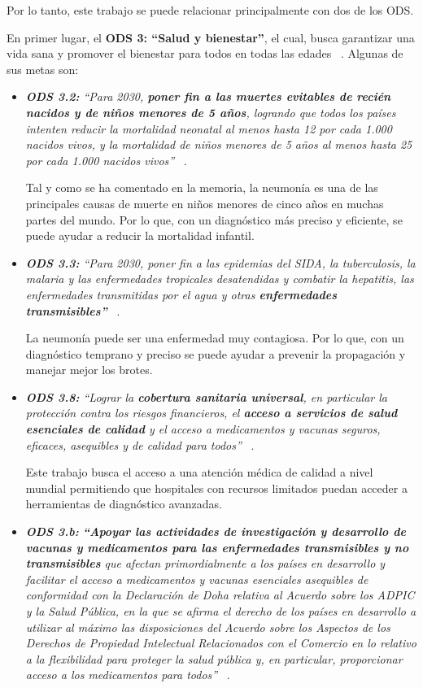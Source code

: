 Por lo tanto, este trabajo se puede relacionar principalmente con dos de los ODS.

En primer lugar, el\textbf{ ODS 3: ``Salud y bienestar''}, el cual, busca garantizar una vida sana y promover el bienestar para todos en todas las edades ~\cite{ObDeSoSalud24}. Algunas de sus metas son:
\begin{itemize}
    \item \textit{\textbf{ODS 3.2:}  ``Para 2030, \textbf{poner fin a las muertes evitables de recién nacidos y de niños menores de 5 años}, logrando que todos los países intenten reducir la mortalidad neonatal al menos hasta 12 por cada 1.000 nacidos vivos, y la mortalidad de niños menores de 5 años al menos hasta 25 por cada 1.000 nacidos vivos''} ~\cite{ObDeSoSalud24}.

    Tal y como se ha comentado en la memoria, la neumonía es una de las principales causas de muerte en niños menores de cinco años en muchas partes del mundo. Por lo que, con un diagnóstico más preciso y eficiente, se puede ayudar a reducir la mortalidad infantil.
    
    \item \textit{\textbf{ODS 3.3:}  ``Para 2030, poner fin a las epidemias del SIDA, la tuberculosis, la malaria y las enfermedades tropicales desatendidas y combatir la hepatitis, las enfermedades transmitidas por el agua y otras \textbf{enfermedades transmisibles''}} ~\cite{ObDeSoSalud24}. 
    
    La neumonía puede ser una enfermedad muy contagiosa. Por lo que, con un diagnóstico temprano y preciso se puede ayudar a prevenir la propagación y manejar mejor los brotes.

    \item \textit{\textbf{ODS 3.8:}  ``Lograr la \textbf{cobertura sanitaria universal}, en particular la protección contra los riesgos financieros, el \textbf{acceso a servicios de salud esenciales de calidad} y el acceso a medicamentos y vacunas seguros, eficaces, asequibles y de calidad para todos''} ~\cite{ObDeSoSalud24}.

    Este trabajo busca el acceso a una atención médica de calidad a nivel mundial permitiendo que hospitales con recursos limitados puedan acceder a herramientas de diagnóstico avanzadas.

    \item \textit{\textbf{ODS 3.b:}  \textbf{``Apoyar las actividades de investigación y desarrollo de vacunas y medicamentos para las enfermedades transmisibles y no transmisibles} que afectan primordialmente a los países en desarrollo y facilitar el acceso a medicamentos y vacunas esenciales asequibles de conformidad con la Declaración de Doha relativa al Acuerdo sobre los ADPIC y la Salud Pública, en la que se afirma el derecho de los países en desarrollo a utilizar al máximo las disposiciones del Acuerdo sobre los Aspectos de los Derechos de Propiedad Intelectual Relacionados con el Comercio en lo relativo a la flexibilidad para proteger la salud pública y, en particular, proporcionar acceso a los medicamentos para todos''} ~\cite{ObDeSoSalud24}.


\end{itemize}
